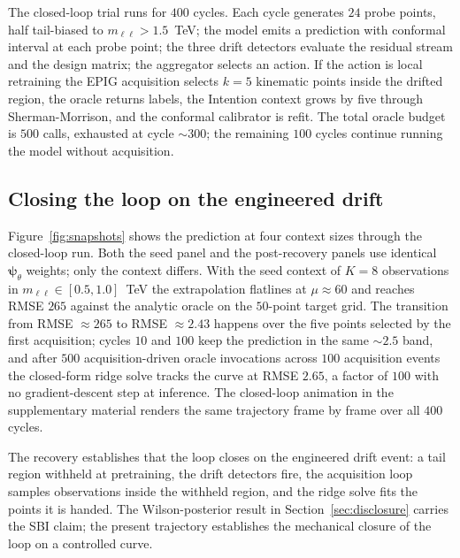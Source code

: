 \documentclass[11pt,a4paper]{article}
\newcommand{\mll}{m_{\ell\ell}}
\newcommand{\psib}{\bm{\psi}}
\begin{document}
The closed-loop trial runs for $400$ cycles. Each cycle generates $24$ probe points, half tail-biased to $\mll > 1.5$~TeV; the model emits a prediction with conformal interval at each probe point; the three drift detectors evaluate the residual stream and the design matrix; the aggregator selects an action. If the action is local retraining the EPIG acquisition selects $k = 5$ kinematic points inside the drifted region, the oracle returns labels, the Intention context grows by five through Sherman-Morrison, and the conformal calibrator is refit. The total oracle budget is $500$ calls, exhausted at cycle $\sim 300$; the remaining $100$ cycles continue running the model without acquisition.

\subsection{Closing the loop on the engineered drift}
\label{sec:recovery}

Figure~\ref{fig:snapshots} shows the prediction at four context sizes through the closed-loop run. Both the seed panel and the post-recovery panels use identical $\psib_\theta$ weights; only the context differs. With the seed context of $K = 8$ observations in $\mll \in [0.5, 1.0]$~TeV the extrapolation flatlines at $\mu \approx 60$ and reaches RMSE $265$ against the analytic oracle on the $50$-point target grid. The transition from RMSE $\approx 265$ to RMSE $\approx 2.43$ happens over the five points selected by the first acquisition; cycles $10$ and $100$ keep the prediction in the same $\sim 2.5$ band, and after $500$ acquisition-driven oracle invocations across $100$ acquisition events the closed-form ridge solve tracks the curve at RMSE $2.65$, a factor of $100$ with no gradient-descent step at inference. The closed-loop animation in the supplementary material renders the same trajectory frame by frame over all $400$ cycles.

The recovery establishes that the loop closes on the engineered drift event: a tail region withheld at pretraining, the drift detectors fire, the acquisition loop samples observations inside the withheld region, and the ridge solve fits the points it is handed. The Wilson-posterior result in Section~\ref{sec:disclosure} carries the SBI claim; the present trajectory establishes the mechanical closure of the loop on a controlled curve.
\end{document}
